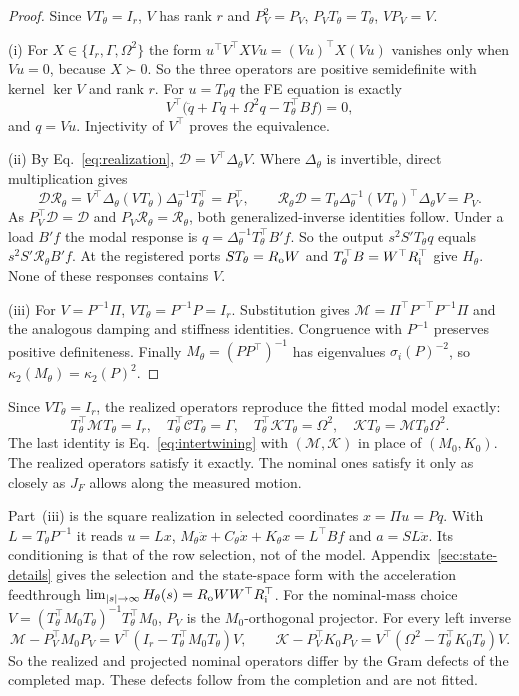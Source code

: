 \begin{proof}
Since $VT_\theta=I_r$, $V$ has rank $r$ and $P_V^2=P_V$,
$P_VT_\theta=T_\theta$, $VP_V=V$.

(i) For $X\in\{I_r,\Gamma,\Omega^2\}$ the form
$u^{\top}V^{\top}XVu=(Vu)^{\top}X(Vu)$ vanishes only when $Vu=0$, because
$X\succ0$. So the three operators are positive semidefinite with kernel
$\ker V$ and rank $r$. For $u=T_\theta q$ the FE equation is exactly
\[
 V^{\top}\bigl(\ddot q+\Gamma\dot q+\Omega^2q-T_\theta^{\top}Bf\bigr)=0,
\]
and $q=Vu$. Injectivity of $V^{\top}$ proves the equivalence.

(ii) By Eq.~\eqref{eq:realization}, $\mathcal D=V^{\top}\Delta_\theta V$.
Where $\Delta_\theta$ is invertible, direct multiplication gives
\[
 \mathcal D\mathcal R_\theta
 =V^{\top}\Delta_\theta(VT_\theta)\Delta_\theta^{-1}T_\theta^{\top}
 =P_V^{\top},\qquad
 \mathcal R_\theta\mathcal D
 =T_\theta\Delta_\theta^{-1}(VT_\theta)^{\top}\Delta_\theta V=P_V.
\]
As $P_V^{\top}\mathcal D=\mathcal D$ and
$P_V\mathcal R_\theta=\mathcal R_\theta$, both generalized-inverse
identities follow. Under a load $B'f$ the modal response is
$q=\Delta_\theta^{-1}T_\theta^{\top}B'f$. So the output
$s^2S'T_\theta q$ equals $s^2S'\mathcal R_\theta B'f$. At the registered
ports $ST_\theta=R_{\rm o}W$ and $T_\theta^{\top}B=W^{\top}R_{\rm i}^{\top}$
give $H_\theta$. None of these responses contains $V$.

(iii) For $V=P^{-1}\Pi$, $VT_\theta=P^{-1}P=I_r$. Substitution gives
$\mathcal M=\Pi^{\top}P^{-\top}P^{-1}\Pi$ and the analogous damping and
stiffness identities. Congruence with $P^{-1}$ preserves positive
definiteness. Finally $M_\theta=(PP^{\top})^{-1}$ has eigenvalues
$\sigma_i(P)^{-2}$, so $\kappa_2(M_\theta)=\kappa_2(P)^2$.
\end{proof}

Since $VT_\theta=I_r$, the realized operators reproduce the fitted modal
model exactly:
\[
 T_\theta^{\top}\mathcal MT_\theta=I_r,\quad
 T_\theta^{\top}\mathcal CT_\theta=\Gamma,\quad
 T_\theta^{\top}\mathcal KT_\theta=\Omega^2,\quad
 \mathcal KT_\theta=\mathcal MT_\theta\Omega^2.
\]
The last identity is Eq.~\eqref{eq:intertwining} with $(\mathcal M,\mathcal K)$
in place of $(M_0,K_0)$. The realized operators satisfy it exactly. The
nominal ones satisfy it only as closely as $J_F$ allows along the measured
motion.

Part~(iii) is the square realization in selected coordinates $x=\Pi u=Pq$.
With $L=T_\theta P^{-1}$ it reads $u=Lx$,
$M_\theta\ddot x+C_\theta\dot x+K_\theta x=L^{\top}Bf$ and $a=SL\ddot x$.
Its conditioning is that of the row selection, not of the model.
Appendix~\ref{sec:state-details} gives the selection and the state-space form
with the acceleration feedthrough
$\lim_{|s|\to\infty}H_\theta(s)=R_{\rm o}WW^{\top}R_{\rm i}^{\top}$.
For the nominal-mass choice
$V=(T_\theta^{\top}M_0T_\theta)^{-1}T_\theta^{\top}M_0$, $P_V$ is the
$M_0$-orthogonal projector. For every left inverse
\[
 \mathcal M-P_V^{\top}M_0P_V=V^{\top}(I_r-T_\theta^{\top}M_0T_\theta)V,\qquad
 \mathcal K-P_V^{\top}K_0P_V=V^{\top}(\Omega^2-T_\theta^{\top}K_0T_\theta)V.
\]
So the realized and projected nominal operators differ by the Gram defects
of the completed map. These defects follow from the completion and are not
fitted.

